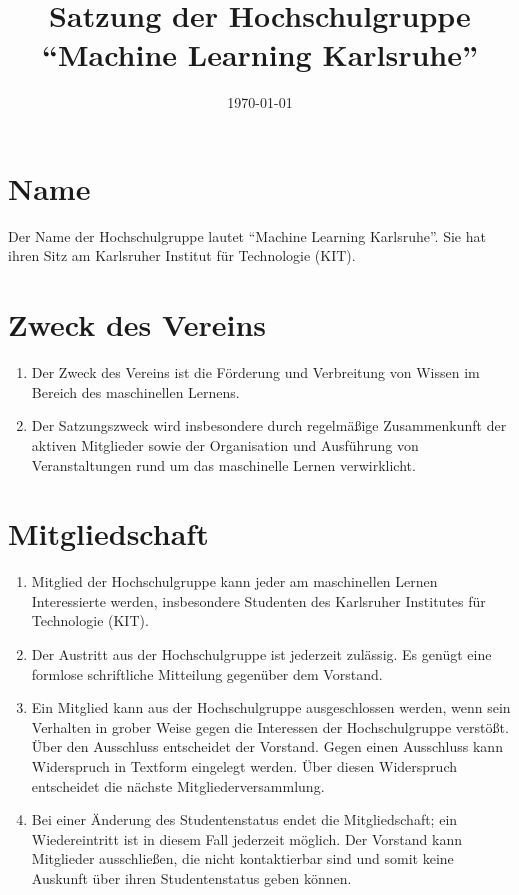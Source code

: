 \documentclass[a4paper]{scrartcl}
\newcommand\GruppenName{Machine Learning Karlsruhe}
\begin{document}
 \author{}
\title{Satzung der Hochschulgruppe \\ \enquote{\GruppenName{}}}
\date{\today}
\maketitle

\section{Name}
Der Name der Hochschulgruppe lautet \enquote{\GruppenName{}}. Sie hat ihren
Sitz am Karlsruher Institut für Technologie (KIT).

\section{Zweck des Vereins}
\begin{enumerate}
    \item Der Zweck des Vereins ist die Förderung und Verbreitung von Wissen
          im Bereich des maschinellen Lernens.
    \item Der Satzungszweck wird insbesondere durch regelmäßige
          Zusammenkunft der aktiven Mitglieder sowie der Organisation und
          Ausführung von Veranstaltungen rund um das maschinelle Lernen
          verwirklicht.
\end{enumerate}

\section{Mitgliedschaft}
\begin{enumerate}
    \item Mitglied der Hochschulgruppe kann jeder am maschinellen Lernen
          Interessierte werden, insbesondere Studenten des Karlsruher
          Institutes für Technologie (KIT).
    \item Der Austritt aus der Hochschulgruppe ist jederzeit zulässig. Es
          genügt eine formlose schriftliche Mitteilung gegenüber dem Vorstand.
    \item Ein Mitglied kann aus der Hochschulgruppe ausgeschlossen werden, wenn
          sein Verhalten in grober Weise gegen die Interessen der
          Hochschulgruppe verstößt. Über den Ausschluss entscheidet der
          Vorstand. Gegen einen Ausschluss kann Widerspruch in Textform
          eingelegt werden. Über diesen Widerspruch entscheidet die nächste
          Mitgliederversammlung.
    \item Bei einer Änderung des Studentenstatus endet die Mitgliedschaft; ein
          Wiedereintritt ist in diesem Fall jederzeit möglich. Der Vorstand
          kann Mitglieder ausschließen, die nicht kontaktierbar sind und somit
          keine Auskunft über ihren Studentenstatus geben können.

\end{enumerate}
\end{document}
